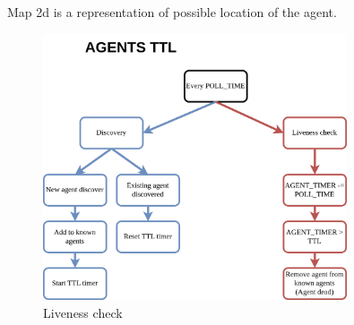 Map 2d is a representation of possible location of the agent.
\begin{figure}[H]
    \centering
    \includegraphics[width=0.8\textwidth]{pictures/agent_ttl.png}
    \caption{ Liveness check }
    \label{fig:liveness_check}
\end{figure}
